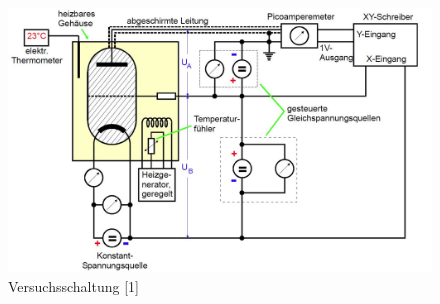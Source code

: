 	\begin{figure}[h]
		\begin{center}
		\includegraphics[scale=0.3]{picaufbau.jpg}
		\caption{Versuchsschaltung [1]}
		\label{picaufbau}
		\end{center}	
	\end{figure}